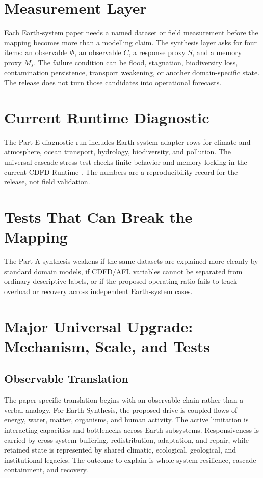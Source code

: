 \documentclass[12pt,a4paper]{article}
\begin{document}
\section{Measurement Layer}

Each Earth-system paper needs a named dataset or field measurement before the
mapping becomes more than a modelling claim. The synthesis layer asks for four
items: an observable $\Phi$, an observable $C$, a response proxy $S$, and a
memory proxy $M_s$. The failure condition can be flood, stagnation, biodiversity
loss, contamination persistence, transport weakening, or another domain-specific
state. The release does not turn those candidates into operational forecasts.

\section{Current Runtime Diagnostic}

The Part E diagnostic run includes Earth-system adapter rows for climate and
atmosphere, ocean transport, hydrology, biodiversity, and pollution. The
universal cascade stress test checks finite behavior and memory locking in the
current CDFD Runtime \cite{CDFDRuntime2026}. The numbers are a reproducibility
record for the release, not field validation.

\section{Tests That Can Break the Mapping}

The Part A synthesis weakens if the same datasets are explained more cleanly by
standard domain models, if CDFD/AFL variables cannot be separated from ordinary
descriptive labels, or if the proposed operating ratio fails to track overload
or recovery across independent Earth-system cases.

\section{Major Universal Upgrade: Mechanism, Scale, and Tests}

\subsection{Observable Translation}

The paper-specific translation begins with an observable chain rather than a
verbal analogy. For Earth Synthesis, the proposed drive is coupled flows of energy, water, matter, organisms, and human activity.
The active limitation is interacting capacities and bottlenecks across Earth subsystems. Responsiveness is carried by
cross-system buffering, redistribution, adaptation, and repair, while retained state is represented by
shared climatic, ecological, geological, and institutional legacies. The outcome to explain is whole-system resilience, cascade containment, and recovery.
\end{document}
